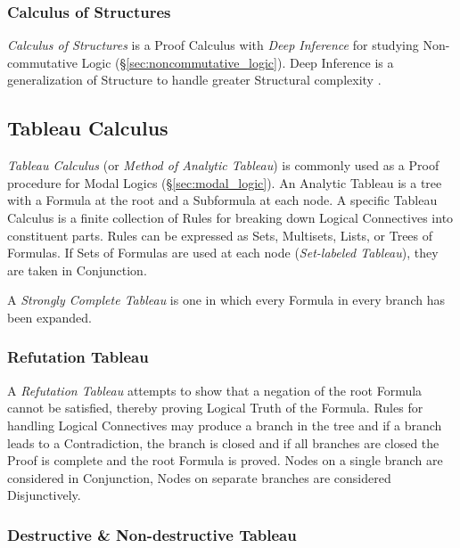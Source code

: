 \subsubsection{Calculus of Structures}\label{sec:calculus_of_structures}

\emph{Calculus of Structures} is a Proof Calculus with \emph{Deep
  Inference} for studying Non-commutative Logic
(\S\ref{sec:noncommutative_logic}). Deep Inference is a
generalization of Structure to handle greater Structural complexity
\cite{schutte77}.



\subsection{Tableau Calculus}\label{sec:tableau_calculus}

\emph{Tableau Calculus} (or \emph{Method of Analytic Tableau}) is
commonly used as a Proof procedure for Modal Logics
(\S\ref{sec:modal_logic}). An Analytic Tableau is a tree with a
Formula at the root and a Subformula at each node. A specific Tableau
Calculus is a finite collection of Rules for breaking down Logical
Connectives into constituent parts. Rules can be expressed as Sets,
Multisets, Lists, or Trees of Formulas. If Sets of Formulas are used
at each node (\emph{Set-labeled Tableau}), they are taken in
Conjunction.

A \emph{Strongly Complete Tableau} is one in which every Formula in
every branch has been expanded.



\subsubsection{Refutation Tableau}\label{sec:refutation_tableau}

A \emph{Refutation Tableau} attempts to show that a negation of the
root Formula cannot be satisfied, thereby proving Logical Truth of the
Formula. Rules for handling Logical Connectives may produce a branch
in the tree and if a branch leads to a Contradiction, the branch is
closed and if all branches are closed the Proof is complete and the
root Formula is proved. Nodes on a single branch are considered in
Conjunction, Nodes on separate branches are considered Disjunctively.



\subsubsection{Destructive \& Non-destructive Tableau}
\label{sec:destructive_tableau}

